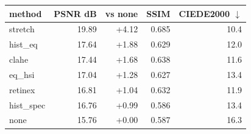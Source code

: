 \begin{tabular}{lrrrr}
\toprule
method & PSNR dB & vs none & SSIM & CIEDE2000 $\downarrow$ \\
\midrule
stretch & 19.89 & +4.12 & 0.685 & 10.4 \\
hist\_eq & 17.64 & +1.88 & 0.629 & 12.0 \\
clahe & 17.44 & +1.68 & 0.638 & 11.6 \\
eq\_hsi & 17.04 & +1.28 & 0.627 & 13.4 \\
retinex & 16.81 & +1.04 & 0.632 & 11.9 \\
hist\_spec & 16.76 & +0.99 & 0.586 & 13.4 \\
none & 15.76 & +0.00 & 0.587 & 16.3 \\
\bottomrule
\end{tabular}
